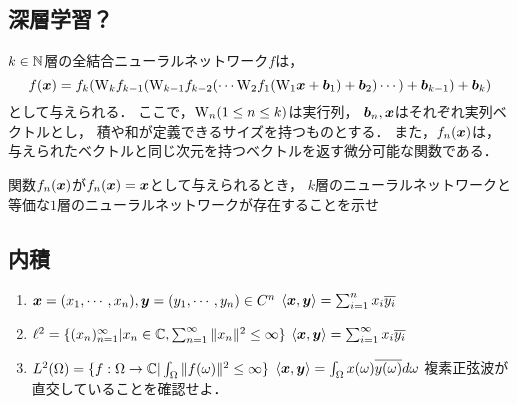 \subsection{深層学習？}
    $k \in \mathbb{N}$層の全結合ニューラルネットワーク$f$は，
    \begin{equation}
    f(\boldsymbol{x}) =
      f_k(\mathrm{W}_k
        f_{k-1}(\mathrm{W}_{k-1}
          f_{k-2}(\cdots \mathrm{W}_2
            f_1(\mathrm{W}_1
              \boldsymbol{x} + \boldsymbol{b}_1)
            + \boldsymbol{b}_2) \cdots)
          + \boldsymbol{b}_{k-1})
        + \boldsymbol{b}_k)
    \end{equation}
    として与えられる．
    ここで，$\mathrm{W}_n (1 \le n \le k)$は実行列，
    $\boldsymbol{b}_n, \boldsymbol{x}$はそれぞれ実列ベクトルとし，
    積や和が定義できるサイズを持つものとする．
    また，$f_n(\boldsymbol{x})$は，
    与えられたベクトルと同じ次元を持つベクトルを返す微分可能な関数である．

    関数$f_n(\boldsymbol{x})$が$f_n(\boldsymbol{x}) = \boldsymbol{x}$として与えられるとき，
    $k$層のニューラルネットワークと等価な$1$層のニューラルネットワークが存在することを示せ


\subsection{内積}
    \begin{enumerate}[label=(\roman*)]
      \item $\boldsymbol{x} = (x_1, \cdots, x_n), \boldsymbol{y}=(y_1, \cdots, y_n) \in C^n$
        $\langle {\boldsymbol{x}}, {\boldsymbol{y}} \rangle = \sum_{i=1}^n x_i \overline{y_i}$
      \item $\ell^2 = \{ (x_n)_{n=1}^{\infty} | x_n \in \mathbb{C}, \sum_{n=1}^\infty \| x_n \|^2 \le \infty \}$
        $\langle {\boldsymbol{x}}, {\boldsymbol{y}} \rangle = \sum_{i=1}^\infty x_i \overline{y_i}$
      \item $L^2(\Omega) = \{ f: \Omega \rightarrow \mathbb{C} | \int_\Omega \| f(\omega) \|^2 \le \infty \}$
        $\langle {\boldsymbol{x}}, {\boldsymbol{y}} \rangle = \int_\Omega x(\omega) \overline{y(\omega)} d\omega$
        複素正弦波が直交していることを確認せよ．
    \end{enumerate}